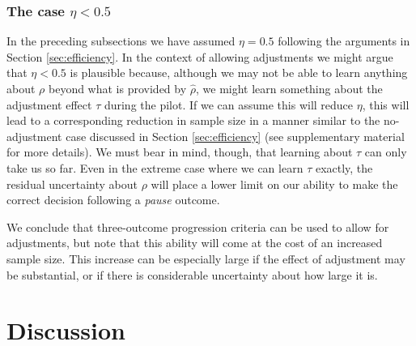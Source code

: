 \documentclass[referee, lineno, pdflatex,sn-vancouver,Numbered]{sn-jnl}%
\theoremstyle{thmstyleone}%
\theoremstyle{thmstyletwo}%
\theoremstyle{thmstylethree}%
\begin{document}
\subsubsection{The case $\eta < 0.5$}

In the preceding subsections we have assumed $\eta = 0.5$ following the arguments in Section \ref{sec:efficiency}. In the context of allowing adjustments we might argue that $\eta < 0.5$ is plausible because, although we may not be able to learn anything about $\rho$ beyond what is provided by $\hat{\rho}$, we might learn something about the adjustment effect $\tau$ during the pilot. If we can assume this will reduce $\eta$, this will lead to a corresponding reduction in sample size in a manner similar to the no-adjustment case discussed in Section \ref{sec:efficiency} (see supplementary material for more details). We must bear in mind, though, that learning about $\tau$ can only take us so far. Even in the extreme case where we can learn $\tau$ exactly, the residual uncertainty about $\rho$ will place a lower limit on our ability to make the correct decision following a \emph{pause} outcome.

We conclude that three-outcome progression criteria can be used to allow for adjustments, but note that this ability will come at the cost of an increased sample size. This increase can be especially large if the effect of adjustment may be substantial, or if there is considerable uncertainty about how large it is.

\section{Discussion}\label{sec:discussion}




\end{document}
